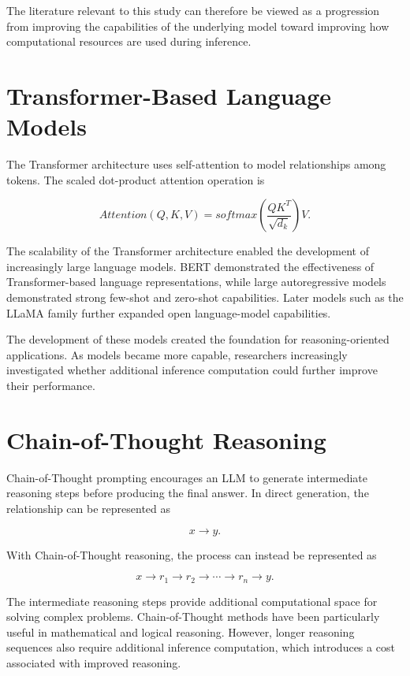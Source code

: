 \documentclass[12pt,a4paper,titlepage]{report}
\begin{document}
The literature relevant to this study can therefore be viewed as a progression from improving the capabilities of the underlying model toward improving how computational resources are used during inference.

\section{Transformer-Based Language Models}

The Transformer architecture uses self-attention to model relationships among tokens. The scaled dot-product attention operation is

\begin{equation}
Attention(Q,K,V)
=
softmax
\left(
\frac{QK^T}{\sqrt{d_k}}
\right)V.
\end{equation}

The scalability of the Transformer architecture enabled the development of increasingly large language models. BERT demonstrated the effectiveness of Transformer-based language representations, while large autoregressive models demonstrated strong few-shot and zero-shot capabilities. Later models such as the LLaMA family further expanded open language-model capabilities.

The development of these models created the foundation for reasoning-oriented applications. As models became more capable, researchers increasingly investigated whether additional inference computation could further improve their performance.

\section{Chain-of-Thought Reasoning}

Chain-of-Thought prompting encourages an LLM to generate intermediate reasoning steps before producing the final answer. In direct generation, the relationship can be represented as

\begin{equation}
x\rightarrow y.
\end{equation}

With Chain-of-Thought reasoning, the process can instead be represented as

\begin{equation}
x\rightarrow r_1\rightarrow r_2\rightarrow\cdots\rightarrow r_n\rightarrow y.
\end{equation}

The intermediate reasoning steps provide additional computational space for solving complex problems. Chain-of-Thought methods have been particularly useful in mathematical and logical reasoning. However, longer reasoning sequences also require additional inference computation, which introduces a cost associated with improved reasoning.
\end{document}
